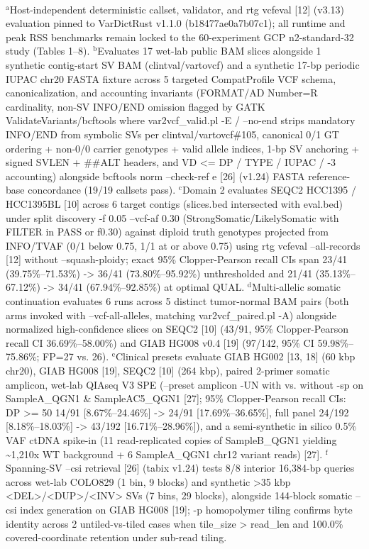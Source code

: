 \begin{table}[htbp]
\\[4pt]\footnotesize{$^{\text{a}}$Host-independent deterministic callset, validator, and rtg vcfeval [12] (v3.13) evaluation pinned to VarDictRust v1.1.0 (b18477ae0a7b07c1); all runtime and peak RSS benchmarks remain locked to the 60-experiment GCP n2-standard-32 study (Tables 1--8). $^{\text{b}}$Evaluates 17 wet-lab public BAM slices alongside 1 synthetic contig-start SV BAM (clintval/vartovcf) and a synthetic 17-bp periodic IUPAC chr20 FASTA fixture across 5 targeted CompatProfile VCF schema, canonicalization, and accounting invariants (FORMAT/AD Number=R cardinality, non-SV INFO/END omission flagged by GATK ValidateVariants/bcftools where var2vcf\_valid.pl -E / --no-end strips mandatory INFO/END from symbolic SVs per clintval/vartovcf\#105, canonical 0/1 GT ordering + non-0/0 carrier genotypes + valid allele indices, 1-bp SV anchoring + signed SVLEN + \#\#ALT headers, and VD \textless{}= DP / TYPE / IUPAC / -3 accounting) alongside bcftools norm --check-ref e [26] (v1.24) FASTA reference-base concordance (19/19 callsets pass). $^{\text{c}}$Domain 2 evaluates SEQC2 HCC1395 / HCC1395BL [10] across 6 target contigs (slices.bed intersected with eval.bed) under split discovery -f 0.05 --vcf-af 0.30 (StrongSomatic/LikelySomatic with FILTER in PASS or f0.30) against diploid truth genotypes projected from INFO/TVAF (0/1 below 0.75, 1/1 at or above 0.75) using rtg vcfeval --all-records [12] without --squash-ploidy; exact 95\% Clopper-Pearson recall CIs span 23/41 (39.75\%--71.53\%) -\textgreater{} 36/41 (73.80\%--95.92\%) unthresholded and 21/41 (35.13\%--67.12\%) -\textgreater{} 34/41 (67.94\%--92.85\%) at optimal QUAL. $^{\text{d}}$Multi-allelic somatic continuation evaluates 6 runs across 5 distinct tumor-normal BAM pairs (both arms invoked with --vcf-all-alleles, matching var2vcf\_paired.pl -A) alongside normalized high-confidence slices on SEQC2 [10] (43/91, 95\% Clopper-Pearson recall CI 36.69\%--58.00\%) and GIAB HG008 v0.4 [19] (97/142, 95\% CI 59.98\%--75.86\%; FP=27 vs. 26). $^{\text{e}}$Clinical presets evaluate GIAB HG002 [13, 18] (60 kbp chr20), GIAB HG008 [19], SEQC2 [10] (264 kbp), paired 2-primer somatic amplicon, wet-lab QIAseq V3 SPE (--preset amplicon -UN with vs. without -sp on SampleA\_QGN1 \& SampleAC5\_QGN1 [27]; 95\% Clopper-Pearson recall CIs: DP \textgreater{}= 50 14/91 [8.67\%--24.46\%] -\textgreater{} 24/91 [17.69\%--36.65\%], full panel 24/192 [8.18\%--18.03\%] -\textgreater{} 43/192 [16.71\%--28.96\%]), and a semi-synthetic in silico 0.5\% VAF ctDNA spike-in (11 read-replicated copies of SampleB\_QGN1 yielding \textasciitilde{}1,210x WT background + 6 SampleA\_QGN1 chr12 variant reads) [27]. $^{\text{f}}$Spanning-SV --csi retrieval [26] (tabix v1.24) tests 8/8 interior 16,384-bp queries across wet-lab COLO829 (1 bin, 9 blocks) and synthetic \textgreater{}35 kbp \textless{}DEL\textgreater{}/\textless{}DUP\textgreater{}/\textless{}INV\textgreater{} SVs (7 bins, 29 blocks), alongside 144-block somatic --csi index generation on GIAB HG008 [19]; -p homopolymer tiling confirms byte identity across 2 untiled-vs-tiled cases when tile\_size \textgreater{} read\_len and 100.0\% covered-coordinate retention under sub-read tiling.}
\end{table}
